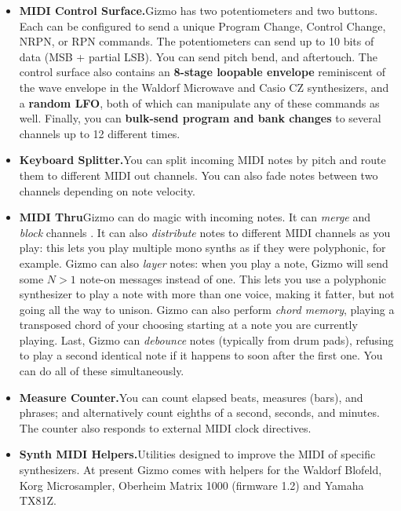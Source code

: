 \documentclass{article}
\begin{document}
\begin{itemize}
\item {\bf MIDI Control Surface.}\quad Gizmo has two potentiometers and two buttons.  Each can be configured to send a unique Program Change, Control Change, NRPN, or RPN commands.  The potentiometers can send up to 10 bits of data (MSB + partial LSB).   You can send pitch bend, and aftertouch.  The control surface also contains an {\bf 8-stage loopable envelope} reminiscent of the wave envelope in the Waldorf Microwave and Casio CZ synthesizers, and a {\bf random LFO}, both of which can manipulate any of these commands as well.  Finally, you can {\bf bulk-send program and bank changes} to several channels up to 12 different times.

\item {\bf  Keyboard Splitter.}\quad You can split incoming MIDI notes by pitch and route them to different MIDI out channels.  You can also fade notes between two channels depending on note velocity.

\item {\bf  MIDI Thru}\quad Gizmo can do magic with incoming notes.  It can {\it merge} and {\it block} channels%
.  It can also {\it distribute} notes to different MIDI channels as you play: this lets you play multiple mono synths as if they were polyphonic, for example.  Gizmo can also {\it layer} notes: when you play a note, Gizmo will send some \(N>1\) note-on messages instead of one.  This lets you use a polyphonic synthesizer to play a note with more than one voice, making it fatter, but not going all the way to unison.  Gizmo can also perform {\it chord memory}, playing a transposed chord of your choosing starting at a note you are currently playing.  Last, Gizmo can {\it debounce} notes (typically from drum pads), refusing to play a second identical note if it happens to soon after the first one.  You can do all of these simultaneously.

\item {\bf  Measure Counter.}\quad You can count elapsed beats, measures (bars), and phrases; and alternatively count eighths of a second, seconds, and minutes.  The counter also responds to external MIDI clock directives.

\item {\bf  Synth MIDI Helpers.}\quad Utilities designed to improve the MIDI of specific synthesizers.  At present Gizmo comes with helpers for the Waldorf Blofeld, Korg Microsampler, Oberheim Matrix 1000 (firmware 1.2) and Yamaha TX81Z.

\end{itemize}
\end{document}
